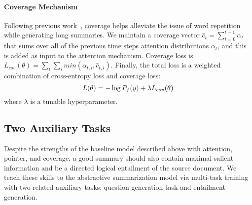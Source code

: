\documentclass[11pt,a4paper]{article}
\begin{document}
\paragraph{Coverage Mechanism}
\label{subsec:coverage-mechanisml}
Following previous work~\cite{see2017get}, coverage helps alleviate the issue of word repetition while generating long summaries. We maintain a coverage vector $\hat{c}_t = \sum_{t=0}^{t-1}\alpha_t$ that sums over all of the previous time steps attention distributions $\alpha_t$, and this is added as input to the attention mechanism. Coverage loss is $L_{cov}(\theta) = \sum_t\sum_i min(\alpha_{t,i},\hat{c}_{t,i})$. 
Finally, the total loss is a weighted combination of cross-entropy loss and coverage loss: 
\vspace{-5pt}
\begin{equation}
L(\theta) = -\log P_f(y) + \lambda L_{cov}(\theta)
\vspace{-5pt}
\end{equation}
where $\lambda$ is a tunable hyperparameter.

\subsection{Two Auxiliary Tasks}
Despite the strengths of the baseline model described above with attention, pointer, and coverage, a good summary should also contain maximal salient information and be a directed logical entailment of the source document. We teach these skills to the abstractive summarization model via multi-task training with two related auxiliary tasks: question generation task and entailment generation.
\end{document}
